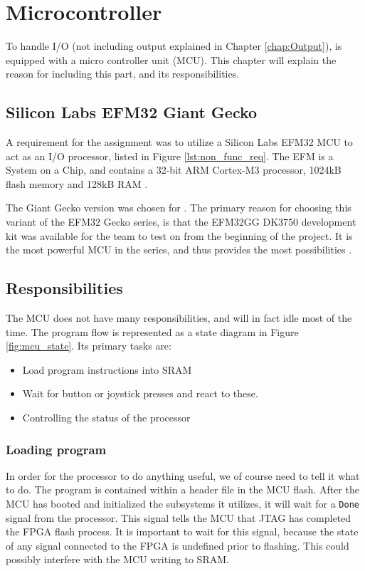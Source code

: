 \chapter{Microcontroller}

To handle I/O (not including output explained in Chapter \ref{chap:Output}), \vthreek is equipped with a micro controller unit (MCU).
This chapter will explain the reason for including this part, and its responsibilities. 

\section{Silicon Labs EFM32 Giant Gecko}
A requirement for the assignment was to utilize a Silicon Labs EFM32 MCU to act as an I/O processor, listed in Figure \ref{lst:non_func_req}.
The EFM is a System on a Chip, and contains a 32-bit ARM Cortex-M3 processor, 1024kB flash memory and 128kB RAM \cite{efm32referencemanual}.

The Giant Gecko version was chosen for \vthreek.
The primary reason for choosing this variant of the EFM32 Gecko series, is that the EFM32GG DK3750 development kit was available for the team to test on from the beginning of the project.
It is the most powerful MCU in the series, and thus provides the most possibilities \cite{efm32}.

\section{Responsibilities}
The MCU does not have many responsibilities, and will in fact idle most of the time. The program flow is represented as a state diagram in Figure \ref{fig:mcu_state}.
Its primary tasks are: 
\begin{itemize}
\item Load program instructions into SRAM
\item Wait for button or joystick presses and react to these.
\item Controlling the status of the processor
\end{itemize}

\subsection{Loading program}
In order for the processor to do anything useful, we of course need to tell it what to do.
The program is contained within a header file in the MCU flash.
After the MCU has booted and initialized the subsystems it utilizes, it will wait for a \texttt{Done} signal from the processor.
This signal tells the MCU that JTAG has completed the FPGA flash process. 
It is important to wait for this signal, because the state of any signal connected to the FPGA is undefined prior to flashing.
This could possibly interfere with the MCU writing to SRAM.

